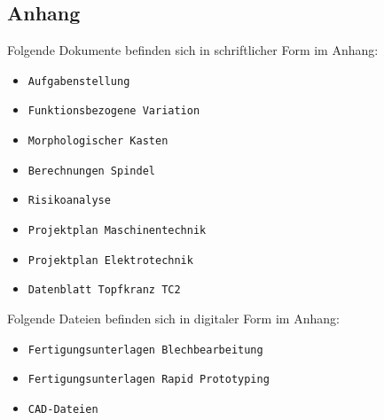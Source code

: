 \newpage
\begin{appendix}
\section{Anhang}
Folgende Dokumente befinden sich in schriftlicher Form im Anhang:

\begin{itemize}
	\item \verb|Aufgabenstellung|
	\item \verb|Funktionsbezogene Variation|
	\item \verb|Morphologischer Kasten|	
	\item \verb|Berechnungen Spindel|
	\item \verb|Risikoanalyse|
	\item \verb|Projektplan Maschinentechnik|
	\item \verb|Projektplan Elektrotechnik|	
	\item \verb|Datenblatt Topfkranz TC2|	
	
	
	
\end{itemize}

Folgende Dateien befinden sich in digitaler Form im Anhang:

\begin{itemize}
	\item \verb|Fertigungsunterlagen Blechbearbeitung|
	\item \verb|Fertigungsunterlagen Rapid Prototyping|
	\item \verb|CAD-Dateien|	
	
\end{itemize}



\end{appendix}